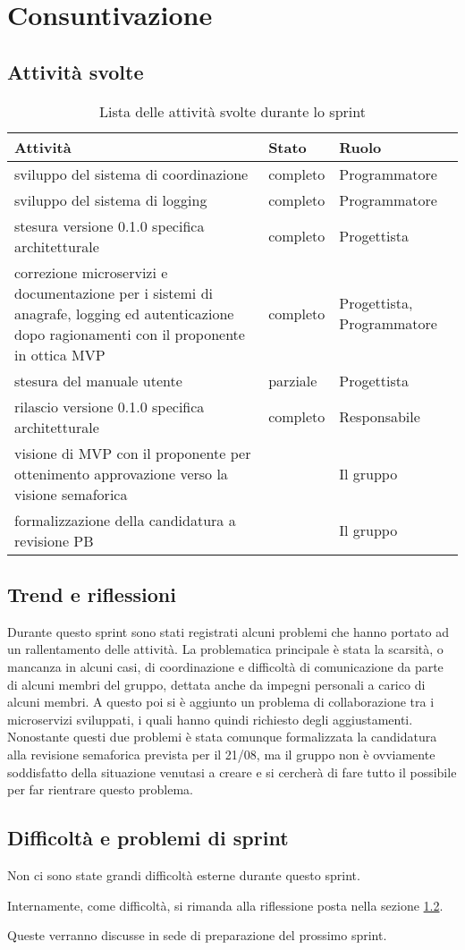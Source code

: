\section{Consuntivazione}

\subsection{Attività svolte}

\begin{table}[H]
    \begin{xltabular}{\textwidth}{X l l}

         \textbf{Attività} & \textbf{Stato} & \textbf{Ruolo}\\
        \endhead
        \hline
        sviluppo del sistema di coordinazione & completo & Programmatore \\
        sviluppo del sistema di logging & completo & Programmatore \\
        stesura versione 0.1.0 specifica architetturale & completo & Progettista\\
        correzione microservizi e documentazione per i sistemi di anagrafe, logging ed autenticazione dopo ragionamenti con il proponente in ottica MVP & completo & Progettista, Programmatore \\
        stesura del manuale utente & parziale & Progettista \\
        rilascio versione 0.1.0 specifica architetturale & completo & Responsabile \\
        visione di MVP con il proponente per ottenimento approvazione verso la visione semaforica & & Il gruppo \\
        formalizzazione della candidatura a revisione PB & & Il gruppo \\
    \end{xltabular}
    \caption{Lista delle attività svolte durante lo sprint}
\end{table}

\subsection{Trend e riflessioni}\label{subsec:trend}

Durante questo sprint sono stati registrati alcuni problemi che hanno portato ad un rallentamento delle attività. La problematica principale è stata la scarsità, o mancanza in alcuni casi, di coordinazione e difficoltà di comunicazione da parte di alcuni membri del gruppo, dettata anche da impegni personali a carico di alcuni membri. A questo poi si è aggiunto un problema di collaborazione tra i microservizi sviluppati, i quali hanno quindi richiesto degli aggiustamenti. Nonostante questi due problemi è stata comunque formalizzata la candidatura alla revisione semaforica prevista per il 21/08, ma il gruppo non è ovviamente soddisfatto della situazione venutasi a creare e si cercherà di fare tutto il possibile per far rientrare questo problema.

\subsection{Difficoltà e problemi di sprint}

Non ci sono state grandi difficoltà esterne durante questo sprint.

Internamente, come difficoltà, si rimanda alla riflessione posta nella sezione \ref{subsec:trend}.

Queste verranno discusse in sede di preparazione del prossimo sprint.